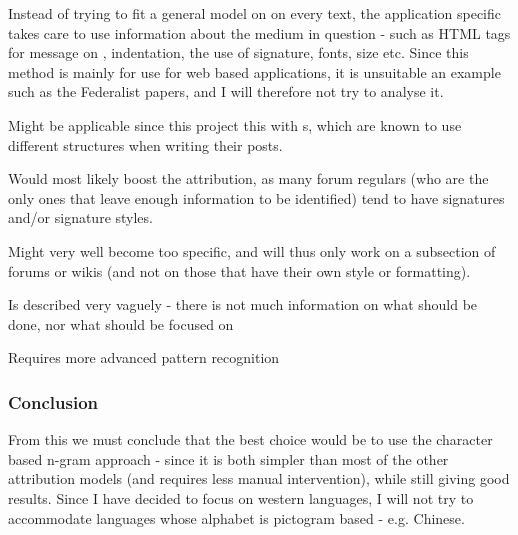 {\label{application}
Instead of trying to fit a general model on on every text, the application specific takes care to use information about the medium in question - such as HTML tags for message on \forum , indentation, the use of signature, fonts, size etc.
}
{
Since this method is mainly for use for web based applications, it is unsuitable an example such as the Federalist papers, and I will therefore not try to analyse it.
}
{
\item Might be applicable since this project this with \forum s, which are known to use different structures when writing their posts.
\item Would most likely boost the attribution, as many forum regulars (who are the only ones that leave enough information to be identified) tend to have signatures and/or signature styles.
}{
\item Might very well become too specific, and will thus only work on a subsection of forums or wikis (and not on those that have their own style or formatting).
\item Is described very vaguely - there is not much information on what should be done, nor what should be focused on
\item Requires more advanced pattern recognition 
}

\subsubsection{Conclusion}
\label{technique:conclusion}
From this we must conclude that the best choice would be to use the character based n-gram approach - since it is both simpler than most of the other attribution models (and requires less manual intervention), while still giving good results. Since I have decided to focus on western languages, I will not try to accommodate languages whose alphabet is pictogram based - e.g. Chinese.
